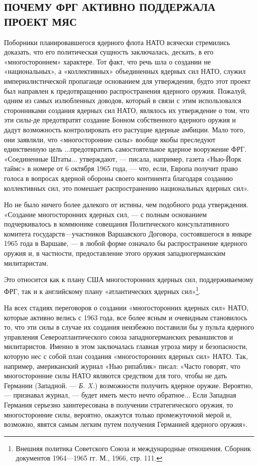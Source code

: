 \documentclass[12pt, a4paper, openany]{book}
\begin{document}
	\subsection[Почему ФРГ активно поддержала проект МЯС]{\center ПОЧЕМУ ФРГ АКТИВНО ПОДДЕРЖАЛА ПРОЕКТ МЯС}
	
	
	Поборники планировавшегося ядерного флота НАТО всячески стремились доказать, что его политическая сущность заключалась, дескать, в его «многостороннем» характере. Тот факт, что речь шла о создании не «национальных», а «коллективных» объединенных ядерных сил НАТО, служил империалистической пропаганде основанием для утверждения, будто этот проект был направлен к предотвращению распространения ядерного оружия. Пожалуй, одним из самых излюбленных доводов, который в связи с этим использовался сторонниками создания ядерных сил НАТО, являлось их утверждение о том, что эти силы-де предотвратят создание Бонном собственного ядерного оружия и дадут возможность контролировать его растущие ядерные амбиции. Мало того, они заявляли, что «многосторонние силы» вообще якобы преследуют единственную цель ...предотвратить самостоятельное ядерное вооружение ФРГ. «Соединенные Штаты... утверждают, — писала, например, газета «Нью-Йорк таймс» в номере от 6 октября 1965 года, — что, если, Европа получит право голоса в вопросах ядерной обороны своего континента благодаря созданию коллективных сил, это помешает распространению национальных ядерных сил».
		
	
	Но не было ничего более далекого от истины, чем подобного рода утверждения. «Создание многосторонних ядерных сил, — с полным основанием подчеркивалось в коммюнике совещания Политического консультативного комитета государств—участников Варшавского Договора, состоявшегося в январе 1965 года в Варшаве, — в любой форме означало бы распространение ядерного оружия и, в частности, предоставление этого оружия западногерманским милитаристам.
	
	Это относится как к плану США многосторонних ядерных сил, поддерживаемому ФРГ, так и к английскому плану «атлантических ядерных сил»{\footnote{Внешняя политика Советского Союза и международные отношения. Сборник документов 1964—1965 гг. М., 1966, стр. 111.
	}}.
	
На всех стадиях переговоров о создании «многосторонних ядерных сил» НАТО, которые активно велись с 1963 года, все более ясным и очевидным становилось то, что эти силы в случае их создания неизбежно поставили бы у пульта ядерного управления Североатлантического союза западногерманских реваншистов и милитаристов. Именно в этом заключалась главная угроза миру и безопасности, которую нес с собой план создания «многосторонних ядерных сил» НАТО. Так, например, американский журнал «Нью рипаблик» писал: «Часто говорят, что многосторонние силы НАТО являются средством для того, чтобы не дать Германии (Западной. — \textit{Б. X.}) возможности получить ядерное оружие. Вероятно, — признавал журнал, — будет иметь место нечто обратное... Если Западная Германия серьезно заинтересована в получении стратегического оружия, то многосторонние силы, вероятно, окажутся только промежуточной мерой и, возможно, явятся самым легким путем получения Германией ядерного оружия».
	
\end{document}
